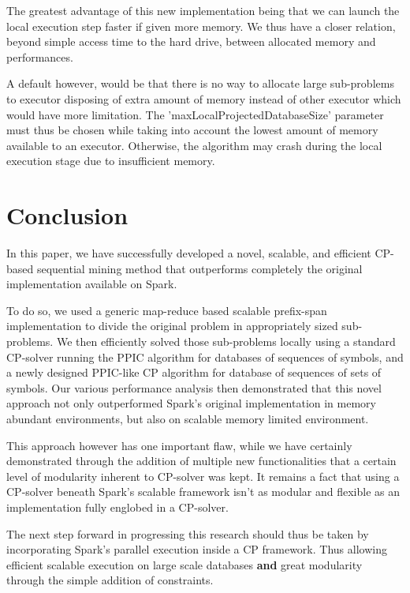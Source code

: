 \documentclass{eplmastersthesis}
\begin{document}
The greatest advantage of this new implementation being that we can launch the local execution step faster if given more memory. We thus have a closer relation, beyond simple access time to the hard drive, between allocated memory and performances. \newline

A default however, would be that there is no way to allocate large sub-problems to executor disposing of extra amount of memory instead of other executor which would have more limitation. The 'maxLocalProjectedDatabaseSize' parameter must thus be chosen while taking into account the lowest amount of memory available to an executor. Otherwise, the algorithm may crash during the local execution stage due to insufficient memory.

\section{Conclusion}

In this paper, we have successfully developed a novel, scalable, and
efficient CP-based sequential mining method that outperforms completely the original implementation available on Spark.\newline

To do so, we used a generic map-reduce based scalable prefix-span implementation to divide the original problem in appropriately sized sub-problems. We then efficiently solved those sub-problems locally using a standard CP-solver running the PPIC algorithm for databases of sequences of symbols, and a newly designed PPIC-like CP algorithm for database of sequences of sets of symbols. Our various performance analysis then demonstrated that this novel approach not only outperformed Spark's original implementation in memory abundant environments, but also on scalable memory limited environment. \newline

This approach however has one important flaw, while we have certainly demonstrated through the addition of multiple new functionalities that a certain level of modularity inherent to CP-solver was kept. It remains a fact that using a CP-solver beneath Spark's scalable framework isn't as modular and flexible as an implementation fully englobed in a CP-solver.

The next step forward in progressing this research should thus be taken by incorporating Spark's parallel execution inside a CP framework. Thus allowing efficient scalable execution on large scale databases \textbf{and} great modularity through the simple addition of constraints.
\end{document}
